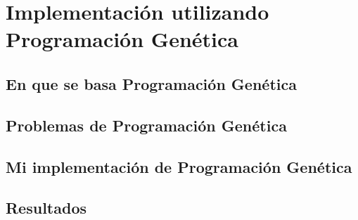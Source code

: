 \section{Implementación utilizando Programación Genética}

\subsection{En que se basa Programación Genética}

\subsection{Problemas de Programación Genética}

\subsection{Mi implementación de Programación Genética}

\subsection{Resultados}
